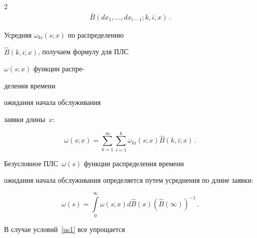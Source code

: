 \begin{multicols}{2}
\begin{multline}
{\bar B}\left(dx_1,\dots,dx_{i-1};k,i,x\right)\,.


\label{w1}


\end{multline}





\noindent


Усредняя $\omega_{ki}(s;x)$ по распределению


${\hat B}(k,i;x)$, получаем формулу для ПЛС


$\omega(s;x)$ функции распре-\linebreak\vspace*{-12pt}





\pagebreak





\noindent


деления времени


ожидания начала обслуживания


заявки длины~$x$:


\begin{equation}


\label{w2}


\omega(s;x)


= \sum\limits_{k=1}^\infty \sum\limits_{i=1}^k \omega_{ki}(s;x) {\hat B}(k,i;x)\,.


\end{equation}








\noindent


Безусловное ПЛС~$\omega(s)$ функции распределения времени


ожидания начала обслуживания определяется путем усреднения по длине заявки:


\begin{equation}


\label{w3}


\omega(s)= \int\limits_0^\infty


\omega(s;x) d{\hat B}(x) ({\hat B}(\infty))^{-1}\,.


\end{equation}





\noindent В случае условий~\eqref{us1} все упрощается



\end{multicols}
